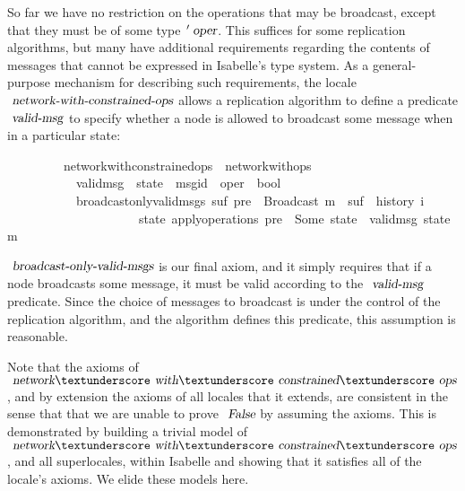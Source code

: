 So far we have no restriction on the operations that may be broadcast, except that they must be of some type $\isacharprime\isa{oper}$.
This suffices for some replication algorithms, but many have additional requirements regarding the contents of messages that cannot be expressed in Isabelle's type system.
As a general-purpose mechanism for describing such requirements, the locale $\isa{network-with-constrained-ops}$ allows a replication algorithm to define a predicate $\isa{valid-msg}$ to specify whether a node is allowed to broadcast some message when in a particular state:
\vspace{0.25em}
\begin{isabellebody}
\ \ \ \ \ \ \ \ \ network{\isacharunderscore}with{\isacharunderscore}constrained{\isacharunderscore}ops\ {\isacharequal}\ network{\isacharunderscore}with{\isacharunderscore}ops\ {\isacharplus}\isanewline
\ \ \ \ \ \ \ \ \ \ \ valid{\isacharunderscore}msg\ {\isacharcolon}{\isacharcolon}\ {\isachardoublequoteopen}{\isacharprime}state\ {\isasymRightarrow}\ {\isacharparenleft}{\isacharprime}msgid\ {\isasymtimes}\ {\isacharprime}oper{\isacharparenright}\ {\isasymRightarrow}\ bool{\isachardoublequoteclose}\isanewline
\ \ \ \ \ \ \ \ \ \ \ broadcast{\isacharunderscore}only{\isacharunderscore}valid{\isacharunderscore}msgs{\isacharcolon}\ {\isachardoublequoteopen}{\isasymexists}suf{\isachardot}\ pre\ {\isacharat}\ {\isacharbrackleft}Broadcast\ m{\isacharbrackright}\ {\isacharat}\ suf\ {\isacharequal}\ history\ i\ {\isasymLongrightarrow}\isanewline
\ \ \ \ \ \ \ \ \ \ \ \ \ \ \ \ \ \ \ \ \ {\isasymexists}state{\isachardot}\ apply{\isacharunderscore}operations\ pre\ {\isacharequal}\ Some\ state\ {\isasymand}\ valid{\isacharunderscore}msg\ state\ m{\isachardoublequoteclose}
\end{isabellebody}
\vspace{0.25em}

$\isa{broadcast-only-valid-msgs}$ is our final axiom, and it simply requires that if a node broadcasts some message, it must be valid according to the $\isa{valid-msg}$ predicate.
Since the choice of messages to broadcast is under the control of the replication algorithm, and the algorithm defines this predicate, this assumption is reasonable.

Note that the axioms of $\isa{network}{\isacharunderscore}\isa{with}{\isacharunderscore}\isa{constrained}{\isacharunderscore}\isa{ops}$, and by extension the axioms of all locales that it extends, are consistent in the sense that that we are unable to prove $\isa{False}$ by assuming the axioms.
This is demonstrated by building a trivial model of $\isa{network}{\isacharunderscore}\isa{with}{\isacharunderscore}\isa{constrained}{\isacharunderscore}\isa{ops}$, and all superlocales, within Isabelle and showing that it satisfies all of the locale's axioms.
We elide these models here.
